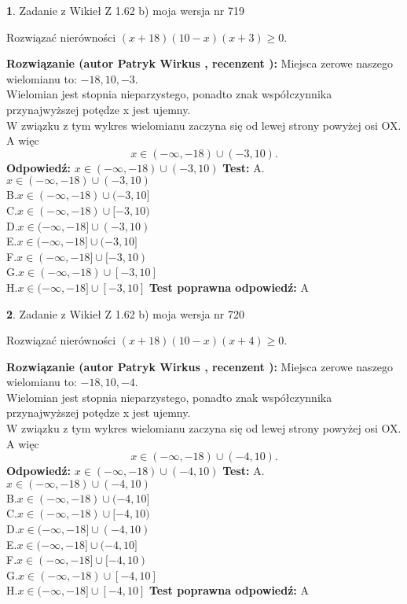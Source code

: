 \documentclass[12pt, a4paper]{article}
\theoremstyle{definition} %
\newtheorem{zad}{}
\newcommand{\zadStart}[1]{\begin{zad}#1\newline}
\newcommand{\zadStop}{\end{zad}}
\newcommand{\rozwStart}[2]{\noindent \textbf{Rozwiązanie (autor #1 , recenzent #2): }\newline}
\newcommand{\rozwStop}{\newline}
\newcommand{\odpStart}{\noindent \textbf{Odpowiedź:}\newline}
\newcommand{\odpStop}{\newline}
\newcommand{\testStart}{\noindent \textbf{Test:}\newline}
\newcommand{\testStop}{\newline}
\newcommand{\kluczStart}{\noindent \textbf{Test poprawna odpowiedź:}\newline}
\newcommand{\kluczStop}{\newline}
\begin{document}
\zadStart{Zadanie z Wikieł Z 1.62 b) moja wersja nr 719}

Rozwiązać nierówności $(x+18)(10-x)(x+3)\ge0$.
\zadStop
\rozwStart{Patryk Wirkus}{}
Miejsca zerowe naszego wielomianu to: $-18, 10, -3$.\\
Wielomian jest stopnia nieparzystego, ponadto znak współczynnika przy\linebreak najwyższej potędze x jest ujemny.\\ W związku z tym wykres wielomianu zaczyna się od lewej strony powyżej osi OX. A więc $$x \in (-\infty,-18) \cup (-3,10).$$
\rozwStop
\odpStart
$x \in (-\infty,-18) \cup (-3,10)$
\odpStop
\testStart
A.$x \in (-\infty,-18) \cup (-3,10)$\\
B.$x \in (-\infty,-18) \cup (-3,10]$\\
C.$x \in (-\infty,-18) \cup [-3,10)$\\
D.$x \in (-\infty,-18] \cup (-3,10)$\\
E.$x \in (-\infty,-18] \cup (-3,10]$\\
F.$x \in (-\infty,-18] \cup [-3,10)$\\
G.$x \in (-\infty,-18) \cup [-3,10]$\\
H.$x \in (-\infty,-18] \cup [-3,10]$
\testStop
\kluczStart
A
\kluczStop



\zadStart{Zadanie z Wikieł Z 1.62 b) moja wersja nr 720}

Rozwiązać nierówności $(x+18)(10-x)(x+4)\ge0$.
\zadStop
\rozwStart{Patryk Wirkus}{}
Miejsca zerowe naszego wielomianu to: $-18, 10, -4$.\\
Wielomian jest stopnia nieparzystego, ponadto znak współczynnika przy\linebreak najwyższej potędze x jest ujemny.\\ W związku z tym wykres wielomianu zaczyna się od lewej strony powyżej osi OX. A więc $$x \in (-\infty,-18) \cup (-4,10).$$
\rozwStop
\odpStart
$x \in (-\infty,-18) \cup (-4,10)$
\odpStop
\testStart
A.$x \in (-\infty,-18) \cup (-4,10)$\\
B.$x \in (-\infty,-18) \cup (-4,10]$\\
C.$x \in (-\infty,-18) \cup [-4,10)$\\
D.$x \in (-\infty,-18] \cup (-4,10)$\\
E.$x \in (-\infty,-18] \cup (-4,10]$\\
F.$x \in (-\infty,-18] \cup [-4,10)$\\
G.$x \in (-\infty,-18) \cup [-4,10]$\\
H.$x \in (-\infty,-18] \cup [-4,10]$
\testStop
\kluczStart
A
\kluczStop
\end{document}
